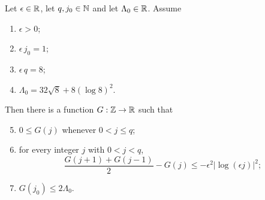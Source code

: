 \begin{lemma}
Let $\epsilon\in\mathbb{R}$, let $q,j_0\in\mathbb{N}$ and let $\Lambda_0\in\mathbb{R}$. Assume
\begin{enumerate}
\item\label{it:llgf-eps} $\epsilon>0$;
\item\label{it:llgf-j0} $\epsilon\,j_0=1$;
\item\label{it:llgf-q} $\epsilon\,q=8$;
\item\label{it:llgf-Lam} $\Lambda_0=32\sqrt8+8(\log8)^2$.
\end{enumerate}
Then there is a function $G:\mathbb{Z}\to\mathbb{R}$ such that
\begin{enumerate}\setcounter{enumi}{4}
\item\label{it:llgf-nn} $0\le G(j)$ whenever $0<j\le q$;
\item\label{it:llgf-poi} for every integer $j$ with $0<j<q$,
\begin{equation}\label{eq:llgf-poi}
  \frac{G(j+1)+G(j-1)}{2}-G(j)
  \le-\epsilon^2\bigl|\log(\epsilon j)\bigr|^2 ;
\end{equation}
\item\label{it:llgf-val} $G(j_0)\le2\Lambda_0$.
\end{enumerate}
\end{lemma}
